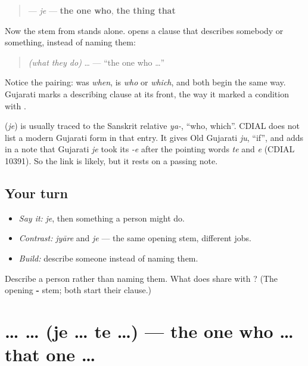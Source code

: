 \begin{cousinweb}
\begin{quote}
\textbf{} — \emph{je} — \textbf{the one who}, \textbf{the thing that}
\end{quote}

Now the stem from \textbf{} stands alone. \textbf{} opens a clause that describes somebody or something, instead of naming them:

\begin{quote}
\textbf{} \emph{(what they do)} … — \textquotedblleft{}the one who …\textquotedblright{}
\end{quote}

Notice the pairing: \textbf{} was \emph{when}, \textbf{} is \emph{who} or \emph{which}, and both begin the same way. Gujarati marks a describing clause at its front, the way it marked a condition with \textbf{}.

\textbf{} (\emph{je}) is usually traced to the Sanskrit relative \emph{ya-}, \textquotedblleft{}who, which\textquotedblright{}. CDIAL does not list a modern Gujarati form in that entry. It gives Old Gujarati \emph{ju}, \textquotedblleft{}if\textquotedblright{}, and adds in a note that Gujarati \emph{je} took its \emph{-e} after the pointing words \emph{te} and \emph{e} (CDIAL 10391). So the link is likely, but it rests on a passing note.
\end{cousinweb}

\subsection*{Your turn}
\begin{itemize}
\raggedright
  \item \emph{Say it:} \emph{je}, then something a person might do.
  \item \emph{Contrast:} \emph{jyāre} and \emph{je} — the same opening stem, different jobs.
  \item \emph{Build:} describe someone instead of naming them.
\end{itemize}

\begin{tcolorbox}[breakable,colback=teal!4,colframe=teal!35!black,title={Before you move on}]
Describe a person rather than naming them. What does \textbf{} share with \textbf{}? (The opening \textbf{-} stem; both start their clause.)
\end{tcolorbox}
\section[\texorpdfstring{\gu{જે} … \gu{તે} … (je … te …)}{જે … તે … (je … te …)}]{ …  … (je … te …) — the one who … that one …}

